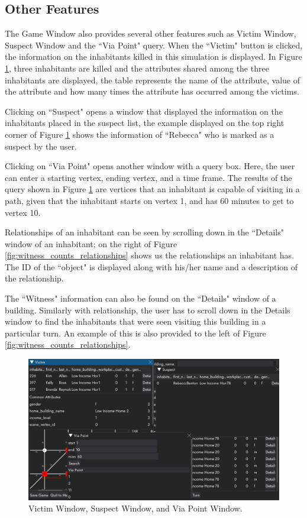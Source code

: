 \documentclass{article}
\begin{document}
\subsection{Other Features}
The Game Window also provides several other features such as Victim Window, Suspect Window and the ``Via Point" query. When the ``Victim" button is clicked, the information on the inhabitants killed in this simulation is displayed. In Figure \ref{fig:victim_suspect_via_point}, three inhabitants are killed and the attributes shared among the three inhabitants are displayed, the table represents the name of the attribute, value of the attribute and how many times the attribute has occurred among the victims.

Clicking on ``Suspect" opens a window that displayed the information on the inhabitants placed in the suspect list, the example displayed on the top right corner of Figure \ref{fig:victim_suspect_via_point} shows the information of ``Rebecca" who is marked as a suspect by the user.

Clicking on ``Via Point" opens another window with a query box. Here, the user can enter a starting vertex, ending vertex, and a time frame. The results of the query shown in Figure \ref{fig:victim_suspect_via_point} are vertices that an inhabitant is capable of visiting in a path, given that the inhabitant starts on vertex 1, and has 60 minutes to get to vertex 10.

Relationships of an inhabitant can be seen by scrolling down in the ``Details" window of an inhabitant; on the right of Figure \ref{fig:witness_counts_relationships} shows us the relationships an inhabitant has. The ID of the ``object" is displayed along with his/her name  and a description of the relationship.

The ``Witness" information can also be found on the ``Details" window of a building. Similarly with relationship, the user has to scroll down in the Details window to find the inhabitants that were seen visiting this building in a particular turn. An example of this is also provided to the left of Figure \ref{fig:witness_counts_relationships}.

\begin{figure}[H]
  \centering
  \includegraphics[width=1\textwidth]{victim_suspect_via_point.png}
  \caption{Victim Window, Suspect Window, and Via Point Window.}
  \label{fig:victim_suspect_via_point}
\end{figure}
\end{document}

